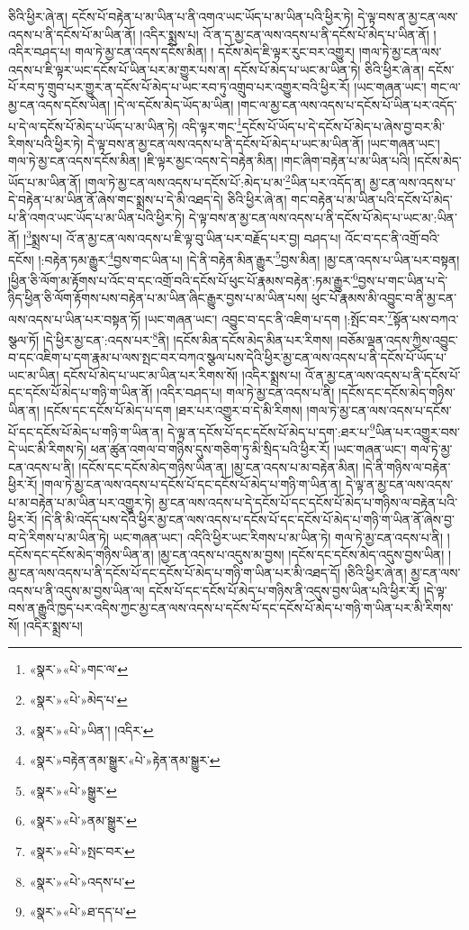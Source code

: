 ཅིའི་ཕྱིར་ཞེ་ན། དངོས་པོ་བརྟེན་པ་མ་ཡིན་པ་ནི་འགའ་ཡང་ཡོད་པ་མ་ཡིན་པའི་ཕྱིར་ཏེ། དེ་ལྟ་བས་ན་མྱ་ངན་ལས་འདས་པ་ནི་དངོས་པོ་མ་ཡིན་ནོ། །འདིར་སྨྲས་པ། འོ་ན་ད་མྱ་ངན་ལས་འདས་པ་ནི་དངོས་པོ་མེད་པ་ཡིན་ནོ། །འདིར་བཤད་པ། གལ་ཏེ་མྱ་ངན་འདས་དངོས་མིན། །
དངོས་མེད་ཇི་ལྟར་རུང་བར་འགྱུར། །གལ་ཏེ་མྱ་ངན་ལས་འདས་པ་ཇི་ལྟར་ཡང་དངོས་པོ་ཡིན་པར་མ་གྱུར་པས་ན། དངོས་པོ་མེད་པ་ཡང་མ་ཡིན་ཏེ། ཅིའི་ཕྱིར་ཞེ་ན། དངོས་པོ་རབ་ཏུ་གྲུབ་པར་གྱུར་ན་དངོས་པོ་མེད་པ་ཡང་རབ་ཏུ་འགྲུབ་པར་འགྱུར་བའི་ཕྱིར་རོ། །ཡང་གཞན་ཡང་། གང་ལ་མྱ་ངན་འདས་དངོས་ཡིན། །དེ་ལ་དངོས་མེད་ཡོད་མ་ཡིན། །གང་ལ་མྱ་ངན་ལས་འདས་པ་དངོས་པོ་ཡིན་པར་འདོད་པ་དེ་ལ་དངོས་པོ་མེད་པ་ཡོད་པ་མ་ཡིན་ཏེ། འདི་ལྟར་གང་\footnote{«སྣར་»«པེ་»གང་ལ་}དངོས་པོ་ཡོད་པ་དེ་དངོས་པོ་མེད་པ་ཞེས་བྱ་བར་མི་རིགས་པའི་ཕྱིར་ཏེ། དེ་ལྟ་བས་ན་མྱ་ངན་ལས་འདས་པ་ནི་དངོས་པོ་མེད་པ་ཡང་མ་ཡིན་ནོ། །ཡང་གཞན་ཡང་། གལ་ཏེ་མྱ་ངན་འདས་དངོས་མིན། །ཇི་ལྟར་མྱང་འདས་དེ་བརྟེན་མིན། །གང་ཞིག་བརྟེན་པ་མ་ཡིན་པའི། །དངོས་མེད་ཡོད་པ་མ་ཡིན་ནོ། །གལ་ཏེ་མྱ་ངན་ལས་འདས་པ་དངོས་པོ་:མེད་པ་མ་\footnote{«སྣར་»«པེ་»མེད་པ་}ཡིན་པར་འདོད་ན། མྱ་ངན་ལས་འདས་པ་དེ་བརྟེན་པ་མ་ཡིན་ནོ་ཞེས་གང་སྨྲས་པ་དེ་མི་འཐད་དེ། ཅིའི་ཕྱིར་ཞེ་ན། གང་བརྟེན་པ་མ་ཡིན་པའི་དངོས་པོ་མེད་པ་ནི་འགའ་ཡང་ཡོད་པ་མ་ཡིན་པའི་ཕྱིར་ཏེ། དེ་ལྟ་བས་ན་མྱ་ངན་ལས་འདས་པ་ནི་དངོས་པོ་མེད་པ་ཡང་མ་:ཡིན་ནོ། །\footnote{«སྣར་»«པེ་»ཡིན་། །འདིར་}སྨྲས་པ། འོ་ན་མྱ་ངན་ལས་འདས་པ་ཇི་ལྟ་བུ་ཡིན་པར་བརྗོད་པར་བྱ། བཤད་པ། འོང་བ་དང་ནི་འགྲོ་བའི་དངོས། །:བརྟེན་ཏམ་རྒྱུར་\footnote{«སྣར་»བརྟེན་ནམ་སྒྱུར་«པེ་»རྟེན་ནམ་སྒྱུར་}བྱས་གང་ཡིན་པ། །དེ་ནི་བརྟེན་མིན་རྒྱུར་\footnote{«སྣར་»«པེ་»སྒྱུར་}བྱས་མིན། །མྱ་ངན་འདས་པ་ཡིན་པར་བསྟན། །ཕྱིན་ཅི་ལོག་མ་རྟོགས་པ་འོང་བ་དང་འགྲོ་བའི་དངོས་པོ་ཕུང་པོ་རྣམས་བརྟེན་:ཏམ་རྒྱུར་\footnote{«སྣར་»«པེ་»ནམ་སྒྱུར་}བྱས་པ་གང་ཡིན་པ་དེ་ཉིད་ཕྱིན་ཅི་ལོག་རྟོགས་པས་བརྟེན་པ་མ་ཡིན་ཞིང་རྒྱུར་བྱས་པ་མ་ཡིན་པས། ཕུང་པོ་རྣམས་མི་འབྱུང་བ་ནི་མྱ་ངན་ལས་འདས་པ་ཡིན་པར་བསྟན་ཏོ། །ཡང་གཞན་ཡང་། འབྱུང་བ་དང་ནི་འཇིག་པ་དག །:སྤོང་བར་\footnote{«སྣར་»«པེ་»སྤང་བར་}སྟོན་པས་བཀའ་སྩལ་ཏོ། །དེ་ཕྱིར་མྱ་ངན་:འདས་པར་\footnote{«སྣར་»«པེ་»འདས་པ་}ནི། །དངོས་མིན་དངོས་མེད་མིན་པར་རིགས། །བཅོམ་ལྡན་འདས་ཀྱིས་འབྱུང་བ་དང་འཇིག་པ་དག་རྣམ་པ་ལས་སྤང་བར་བཀའ་སྩལ་པས་དེའི་ཕྱིར་མྱ་ངན་ལས་འདས་པ་ནི་དངོས་པོ་ཡོད་པ་ཡང་མ་ཡིན། དངོས་པོ་མེད་པ་ཡང་མ་ཡིན་པར་རིགས་སོ། །འདིར་སྨྲས་པ། འོ་ན་མྱ་ངན་ལས་འདས་པ་ནི་དངོས་པོ་དང་དངོས་པོ་མེད་པ་གཉི་ག་ཡིན་ནོ། །འདིར་བཤད་པ། གལ་ཏེ་མྱ་ངན་འདས་པ་ནི། །དངོས་དང་དངོས་མེད་གཉིས་ཡིན་ན། །དངོས་དང་དངོས་པོ་མེད་པ་དག །ཐར་པར་འགྱུར་བ་དེ་མི་རིགས། །གལ་ཏེ་མྱ་ངན་ལས་འདས་པ་དངོས་པོ་དང་དངོས་པོ་མེད་པ་གཉི་ག་ཡིན་ན། དེ་ལྟ་ན་དངོས་པོ་དང་དངོས་པོ་མེད་པ་དག་:ཐར་པ་\footnote{«སྣར་»«པེ་»ཐ་དད་པ་}ཡིན་པར་འགྱུར་བས་དེ་ཡང་མི་རིགས་ཏེ། ཕན་ཚུན་འགལ་བ་གཉིས་དུས་གཅིག་ཏུ་མི་སྲིད་པའི་ཕྱིར་རོ། །ཡང་གཞན་ཡང་། གལ་ཏེ་མྱ་ངན་འདས་པ་ནི། །དངོས་དང་དངོས་མེད་གཉིས་ཡིན་ན། །མྱ་ངན་འདས་པ་མ་བརྟེན་མིན། །དེ་ནི་གཉིས་ལ་བརྟེན་ཕྱིར་རོ། །གལ་ཏེ་མྱ་ངན་ལས་འདས་པ་དངོས་པོ་དང་དངོས་པོ་མེད་པ་གཉི་ག་ཡིན་ན། དེ་ལྟ་ན་མྱ་ངན་ལས་འདས་པ་མ་བརྟེན་པ་མ་ཡིན་པར་འགྱུར་ཏེ། མྱ་ངན་ལས་འདས་པ་དེ་དངོས་པོ་དང་དངོས་པོ་མེད་པ་གཉིས་ལ་བརྟེན་པའི་ཕྱིར་རོ། །དེ་ནི་མི་འདོད་པས་དེའི་ཕྱིར་མྱ་ངན་ལས་འདས་པ་དངོས་པོ་དང་དངོས་པོ་མེད་པ་གཉི་ག་ཡིན་ནོ་ཞེས་བྱ་བ་དེ་རིགས་པ་མ་ཡིན་ཏེ། ཡང་གཞན་ཡང་། འདིའི་ཕྱིར་ཡང་རིགས་པ་མ་ཡིན་ཏེ། གལ་ཏེ་མྱ་ངན་འདས་པ་ནི། །དངོས་དང་དངོས་མེད་གཉིས་ཡིན་ན། །མྱ་ངན་འདས་པ་འདུས་མ་བྱས། །དངོས་དང་དངོས་མེད་འདུས་བྱས་ཡིན། །མྱ་ངན་ལས་འདས་པ་ནི་དངོས་པོ་དང་དངོས་པོ་མེད་པ་གཉི་ག་ཡིན་པར་མི་འཐད་དོ། །ཅིའི་ཕྱིར་ཞེ་ན། མྱ་ངན་ལས་འདས་པ་ནི་འདུས་མ་བྱས་ཡིན་ལ། དངོས་པོ་དང་དངོས་པོ་མེད་པ་གཉིས་ནི་འདུས་བྱས་ཡིན་པའི་ཕྱིར་རོ། །དེ་ལྟ་བས་ན་རྒྱུའི་ཁྱད་པར་འདིས་ཀྱང་མྱ་ངན་ལས་འདས་པ་དངོས་པོ་དང་དངོས་པོ་མེད་པ་གཉི་ག་ཡིན་པར་མི་རིགས་སོ། །འདིར་སྨྲས་པ། 